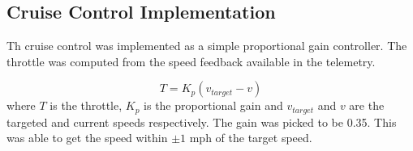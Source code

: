 \documentclass[paper=letter, fontsize=11pt]{scrartcl}
\numberwithin{equation}{section}		%
\numberwithin{figure}{section}			%
\numberwithin{table}{section}				%
\begin{document}
\subsection{Cruise Control Implementation}
Th cruise control was implemented as a simple proportional gain controller. The throttle was computed from the speed feedback available in the telemetry.

\[
T = K_p \left(v_{target} - v\right)
\]
where $T$ is the throttle, $K_p$ is the proportional gain and $v_{target}$ and $v$ are the targeted and current speeds respectively. The gain was picked to be 0.35. This was able to get the speed within $\pm 1$ mph of the target speed.


 
\end{document}
